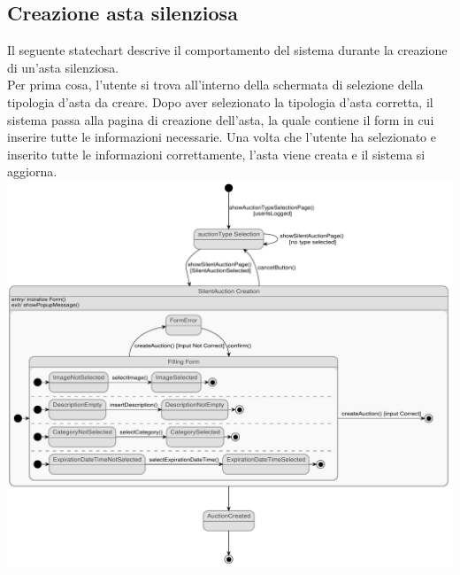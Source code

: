 \subsection{Creazione asta silenziosa}
Il seguente statechart descrive il comportamento del sistema durante la creazione di un'asta silenziosa.\\
Per prima cosa, l'utente si trova all'interno della schermata di selezione della tipologia d'asta da creare.
Dopo aver selezionato la tipologia d'asta corretta, il sistema passa alla pagina di creazione dell'asta, la quale contiene il form in cui inserire tutte le informazioni necessarie. Una volta che l'utente ha selezionato e inserito tutte le informazioni correttamente, l'asta viene creata e il sistema si aggiorna.\bskip
\includegraphics[width=\textwidth]{assets/state_charts/creazione_asta_silenziosa.pdf}
\newpage

